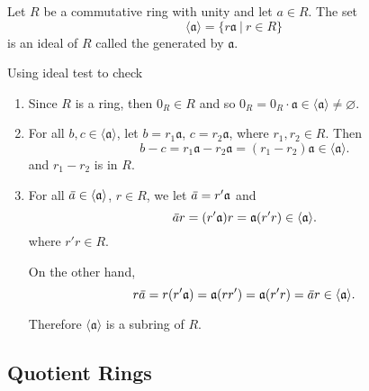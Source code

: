 \begin{example}
    Let $R$ be a commutative ring with unity and let $a \in R$. The set 
    \[
        \langle \mathfrak{a} \rangle = \{ r\mathfrak{a} \> | \> r \in R \}
    \]
    is an ideal of $R$ called the  generated by $\mathfrak{a}$.
\end{example}
\begin{solution}
    Using ideal test to check
    \begin{enumerate}
        \item Since $R$ is a ring, then $0_R \in R$ and so $0_R = 0_R \cdot \mathfrak{a} \in \langle \mathfrak{a} \rangle \neq \varnothing$.
        \item For all $b, c \in \langle \mathfrak{a} \rangle$, let $b = r_1 \mathfrak{a}$, $c = r_2 \mathfrak{a}$, where 
        $r_1, r_2 \in R$. Then 
        \[
            b - c = r_1 \mathfrak{a} - r_2 \mathfrak{a} = (r_1 - r_2) \mathfrak{a} \in \langle \mathfrak{a} \rangle.
        \]
        and $r_1 - r_2$ is in $R$.

        \item For all $\,\overline{\!{a}} \in \langle \mathfrak{a} \rangle$, $r \in R$, we let $\,\overline{\!{a}} = r' \mathfrak{a}$ and 
        \[
            \,\overline{\!{a}}r = (r' \mathfrak{a}) r = \mathfrak{a}(r'r) \in \langle \mathfrak{a} \rangle.
        \]
        where $r'r \in R$.

        On the other hand, 
        \[
            r\,\overline{\!{a}} = r(r' \mathfrak{a}) = \mathfrak{a}(rr') = \mathfrak{a}(r'r) = \,\overline{\!{a}} r \in \langle \mathfrak{a} \rangle.
        \]

        Therefore $\langle \mathfrak{a} \rangle$ is a subring of $R$.
    \end{enumerate}
\end{solution}


\subsection{Quotient Rings}

